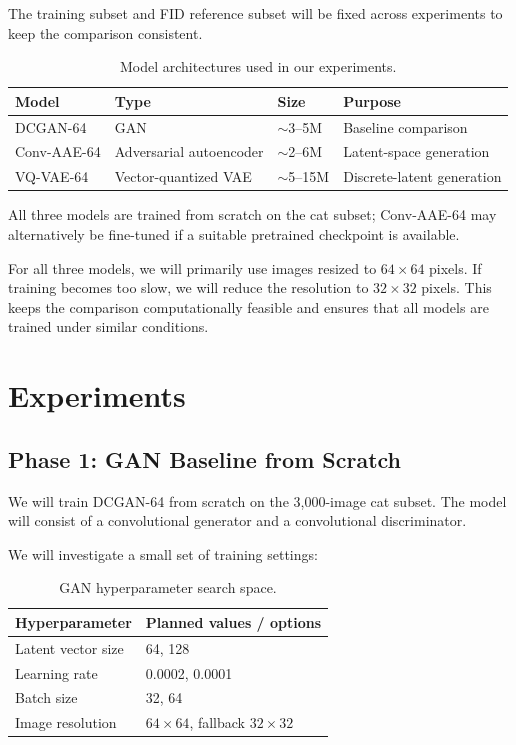 \documentclass[11pt,a4paper]{article}
\begin{document}
The training subset and FID reference subset will be fixed across experiments to keep the comparison consistent.

\begin{table}[h]
\centering
\small
\caption{Model architectures used in our experiments.}
\begin{tabularx}{\textwidth}{@{}lXlp{2.1cm}@{}}
\toprule
\textbf{Model} & \textbf{Type} & \textbf{Size} & \textbf{Purpose} \\ \midrule
DCGAN-64 & GAN & $\sim$3--5M & Baseline comparison \\
Conv-AAE-64 & Adversarial autoencoder & $\sim$2--6M & Latent-space generation \\
VQ-VAE-64 & Vector-quantized VAE & $\sim$5--15M & Discrete-latent generation \\ \bottomrule
\end{tabularx}
\end{table}

\noindent All three models are trained from scratch on the cat subset; Conv-AAE-64 may alternatively be fine-tuned if a suitable pretrained checkpoint is available.

For all three models, we will primarily use images resized to $64\times64$ pixels. If training becomes too slow, we will reduce the resolution to $32\times32$ pixels. This keeps the comparison computationally feasible and ensures that all models are trained under similar conditions.

\section{Experiments}

\subsection{Phase 1: GAN Baseline from Scratch}
We will train DCGAN-64 from scratch on the 3,000-image cat subset. The model will consist of a convolutional generator and a convolutional discriminator.

We will investigate a small set of training settings:
\begin{table}[h]
\centering
\caption{GAN hyperparameter search space.}
\begin{tabular}{@{}ll@{}}
\toprule
\textbf{Hyperparameter} & \textbf{Planned values / options} \\ \midrule
Latent vector size & 64, 128 \\
Learning rate & 0.0002, 0.0001 \\
Batch size & 32, 64 \\
Image resolution & $64\times64$, fallback $32\times32$ \\ \bottomrule
\end{tabular}
\end{table}
\end{document}
